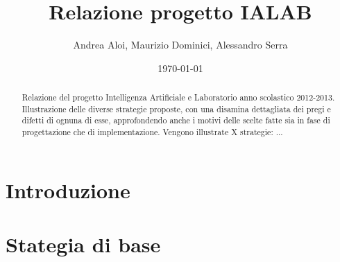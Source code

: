 \documentclass[a4paper,12pt]{report}
\title{Relazione progetto IALAB}
\author{Andrea Aloi, Maurizio Dominici, Alessandro Serra}
\date{\today}
\begin{document}
\maketitle
 
\begin{abstract}
Relazione del progetto Intelligenza Artificiale e Laboratorio anno scolastico 2012-2013.
Illustrazione delle diverse strategie proposte, con una disamina dettagliata dei pregi e difetti di ognuna di esse, approfondendo anche i motivi delle scelte fatte sia in fase di progettazione che di implementazione. Vengono illustrate X strategie: ...
\end{abstract}

\newpage
 
\tableofcontents
\clearpage{\pagestyle{empty}\cleardoublepage}

\chapter{Introduzione} \label{cap:intro}


\chapter{Stategia di base} \label{cap:base}

\end{document}
